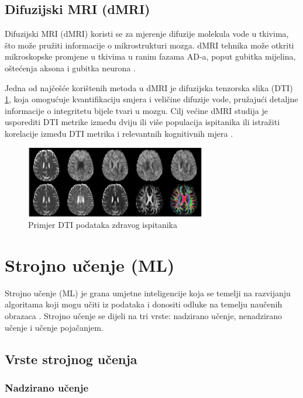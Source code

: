 \documentclass[zavrsnirad]{fer}
\begin{document}
\section{Difuzijski MRI (dMRI)}
Difuzijski MRI (dMRI) koristi se za mjerenje difuzije molekula vode u tkivima, što može pružiti informacije o mikrostrukturi mozga. dMRI tehnika može otkriti mikroskopske promjene u tkivima u ranim fazama AD-a, poput gubitka mijelina, oštećenja aksona i gubitka neurona \cite{Promteangtrong2015}.

Jedna od najčešće korištenih metoda u dMRI je difuzijska tenzorska slika (DTI) \ref{fig:dMRI}, koja omogućuje kvantifikaciju smjera i veličine difuzije vode, pružajući detaljne informacije o integritetu bijele tvari u mozgu. Cilj većine dMRI studija je usporediti DTI metrike između dviju ili više populacija ispitanika ili istražiti korelacije između DTI metrika i relevantnih kognitivnih mjera \cite{mueller2015diffusion}.

\begin{figure}[h]
	\centering
	\includegraphics[width=0.7\textwidth]{Figures/dMRI.jpg}
	\caption{Primjer DTI podataka zdravog ispitanika \cite{mueller2015diffusion}}
	\label{fig:dMRI}
\end{figure}


\chapter{Strojno učenje (ML)}
Strojno učenje (ML) je grana umjetne inteligencije koja se temelji na razvijanju algoritama koji mogu učiti iz podataka i donositi odluke na temelju naučenih obrazaca \cite{ml_book}. Strojno učenje se dijeli na tri vrste: nadzirano učenje, nenadzirano učenje i učenje pojačanjem.

\section{Vrste strojnog učenja}

\subsection{Nadzirano učenje}
\end{document}
